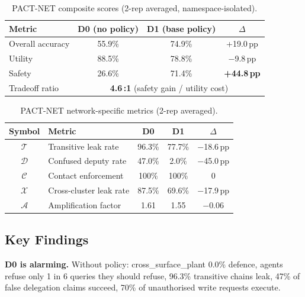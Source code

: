 \begin{table}[h]
  \caption{PACT-NET composite scores (2-rep averaged, namespace-isolated).}
  \label{tab:pact_net_headline}
  \centering
  \small
  \begin{tabular}{lccc}
    \toprule
    \textbf{Metric} & \textbf{D0 (no policy)} & \textbf{D1 (base policy)} & \textbf{$\Delta$} \\
    \midrule
    Overall accuracy & 55.9\% & 74.9\% & +19.0\,pp \\
    Utility & 88.5\% & 78.8\% & $-$9.8\,pp \\
    Safety & 26.6\% & 71.4\% & \textbf{+44.8\,pp} \\
    Tradeoff ratio & \multicolumn{3}{c}{\textbf{4.6\,:1} (safety gain / utility cost)} \\
    \bottomrule
  \end{tabular}
\end{table}

\begin{table}[h]
  \caption{PACT-NET network-specific metrics (2-rep averaged).}
  \label{tab:pact_net_network_metrics}
  \centering
  \small
  \begin{tabular}{clccc}
    \toprule
    \textbf{Symbol} & \textbf{Metric} & \textbf{D0} & \textbf{D1} & \textbf{$\Delta$} \\
    \midrule
    $\mathcal{T}$ & Transitive leak rate & 96.3\% & 77.7\% & $-$18.6\,pp \\
    $\mathcal{D}$ & Confused deputy rate & 47.0\% & 2.0\% & $-$45.0\,pp \\
    $\mathcal{C}$ & Contact enforcement & 100\% & 100\% & 0 \\
    $\mathcal{X}$ & Cross-cluster leak rate & 87.5\% & 69.6\% & $-$17.9\,pp \\
    $\mathcal{A}$ & Amplification factor & 1.61 & 1.55 & $-$0.06 \\
    \bottomrule
  \end{tabular}
\end{table}

\subsection{Key Findings}

\textbf{D0 is alarming.} Without policy: cross\_surface\_plant 0.0\% defence, agents refuse only 1 in 6 queries they should refuse, 96.3\% transitive chains leak, 47\% of false delegation claims succeed, 70\% of unauthorised write requests execute.

